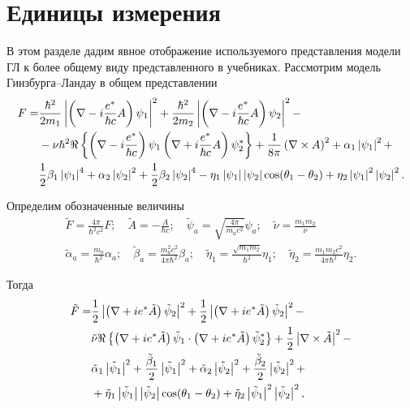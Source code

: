 \section{Единицы измерения}
\label{sec:units}

В этом разделе дадим явное отображение используемого представления модели ГЛ к 
более общему виду представленного в учебниках. Рассмотрим модель 
Гинзбурга--Ландау в общем представлении
\begin{align}
  F = & \frac{\hbar^2}{2m_1} \left| \left( \nabla - i\frac{e^*}{\hbar c} A\right)
    \psi_1 \right|^2 + \frac{\hbar^2}{2m_2} \left| \left( \nabla - i\frac{e^*}{\hbar c}A
    \right) \psi_2 \right|^2 - \nonumber \\
  & - \nu\hbar^2 \Re\left\{ \left( \nabla - i\frac{e^*}{\hbar c}
    \right)\psi_1 \left( \nabla + i\frac{e^*}{\hbar c}A \right)
    \psi^*_2\right\} + \frac{1}{8\pi}\left( \nabla\times A \right)^2 +
    \alpha_1\left| \psi_1 \right|^2 + \nonumber \\
  & \frac{1}{2}\beta_1\left| \psi_1 \right|^4 + \alpha_2\left| \psi_2 \right|^2 + \frac{1}{2}
    \beta_2\left| \psi_2 \right|^4 - \eta_1\left| \psi_1 \right|\left| \psi_2 \right|
    \cos(\theta_1 - \theta_2) + \eta_2\left| \psi_1 \right|^2\left| \psi_2 \right|^2.
    \label{eq:B-1}
\end{align}

Определим обозначенные величины
\begin{gather}
  \tilde{F} = \frac{4\pi}{\hbar^2 c^2}F; \quad
    \tilde{A} = -\frac{A}{\hbar c}; \quad
    \tilde{\psi}_a = \sqrt{\frac{4\pi}{m_a c^2}}\psi_a; \quad
    \tilde{\nu} = \frac{m_1m_2}\nu \nonumber \\
  \tilde{\alpha}_a = \frac{m_a}{\hbar^2}\alpha_a; \quad
    \tilde{\beta}_a = \frac{m^2_a c^2}{4\pi\hbar^2}\beta_a; \quad
    \tilde{\eta}_1 = \frac{\sqrt{m_1 m_2}}{\hbar^2}\eta_1; \quad
    \tilde{\eta}_2 = \frac{m_1 m_2 c^2}{4\pi\hbar^2}\eta_2. \label{eq:B-2}
\end{gather}

Тогда
\begin{align}
  \tilde{F} = & \frac{1}{2}\left| \left( \nabla + ie^*\tilde{A} \right)
    \tilde{\psi}_2 \right|^2 + \frac{1}{2}\left| \left( \nabla + ie^*\tilde{A} \right)
    \tilde{\psi}_2 \right|^2 - \nonumber \\ 
  & \tilde{\nu} \Re\left\{ \left( \nabla + ie^*\tilde{A}
    \right)\tilde{\psi}_1 \cdot \left( \nabla + ie^*\tilde{A} \right)
    \tilde{\psi}^*_2 \right\} + \frac{1}{2}\left| \nabla\times\tilde{A} \right|^2 - 
    \nonumber \\
  & \tilde{\alpha}_1
    \left| \tilde{\psi}_1 \right|^2 + \frac{\tilde{\beta}_1}{2}\left| \tilde{\psi}_1 \right|^2 +
    \tilde{\alpha}_2\left| \tilde{\psi}_2 \right|^2 +
    \frac{\tilde{\beta}_2}{2}\left| \tilde{\psi}_2 \right|^2 + \nonumber \\
  & + \tilde{\eta}_1 \left| \tilde{\psi}_1 \right| \left| \tilde{\psi}_2 \right|
    \cos(\theta_1 - \theta_2) + \tilde{\eta}_2\left| \tilde{\psi}_1 \right|^2
    \left| \tilde{\psi}_2 \right|^2, \label{eq:B-3}
\end{align}

